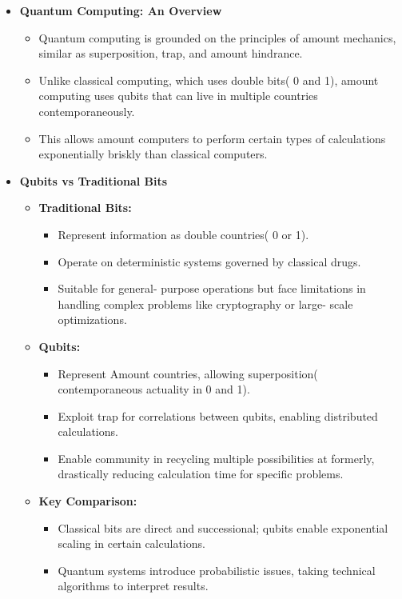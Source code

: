 \documentclass[conference]{IEEEtran}
\begin{document}
\begin{itemize}
    \item \textbf{Quantum Computing: An Overview}
    \begin{itemize}
        \item Quantum computing is grounded on the principles of amount mechanics, similar as superposition, trap, and amount hindrance.
        \item Unlike classical computing, which uses double bits( 0 and 1), amount computing uses qubits that can live in multiple countries contemporaneously.
        \item This allows amount computers to perform certain types of calculations exponentially briskly than classical computers.
    \end{itemize}

    \item \textbf{Qubits vs Traditional Bits}
    \begin{itemize}
        \item \textbf{Traditional Bits:} 
        \begin{itemize}
            \item Represent information as double countries( 0 or 1).
            \item Operate on deterministic systems governed by classical drugs.
            \item Suitable for general- purpose operations but face limitations in handling complex problems like cryptography or large- scale optimizations.
        \end{itemize}
        \item \textbf{Qubits:} 
        \begin{itemize}
           \item Represent Amount countries, allowing superposition( contemporaneous actuality in 0 and 1).
           \item Exploit trap for correlations between qubits, enabling distributed calculations.
           \item Enable community in recycling multiple possibilities at formerly, drastically reducing calculation time for specific problems.
        \end{itemize}
        \item \textbf{Key Comparison:}
        \begin{itemize}
            \item Classical bits are direct and successional; qubits enable exponential scaling in certain calculations.
            \item Quantum systems introduce probabilistic issues, taking technical algorithms to interpret results.
        \end{itemize}
    \end{itemize}


\end{itemize}
\end{document}
